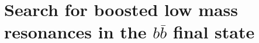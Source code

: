 \chapter{Search for boosted low mass resonances in the $b\bar{b}$ final state}\label{chapter:analysis}
